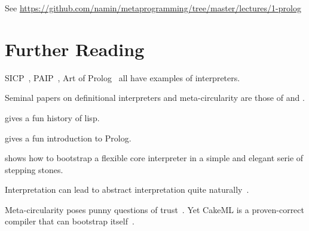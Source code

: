 See \url{https://github.com/namin/metaprogramming/tree/master/lectures/1-prolog}

\section{Further Reading}

SICP~\citep{sicp}, PAIP~\citep{paip}, Art of Prolog~\citep{art-prolog}
all have examples of interpreters.

Seminal papers on definitional interpreters and meta-circularity are
those of \cite{eval} and \cite{eval-reynolds}.

\cite{lisp-history} gives a fun history of lisp.

\cite{ferguson} gives a fun introduction to Prolog.

\cite{oecm} shows how to bootstrap a flexible core interpreter in a
simple and elegant serie of stepping stones.

Interpretation can lead to abstract interpretation quite naturally~\citep{meta_circ_prolog,darais}.

Meta-circularity poses punny questions of
trust~\citep{trusting-trust}. Yet CakeML is a proven-correct compiler
that can bootstrap itself~\citep{cakeml,cakeml-thesis}.

